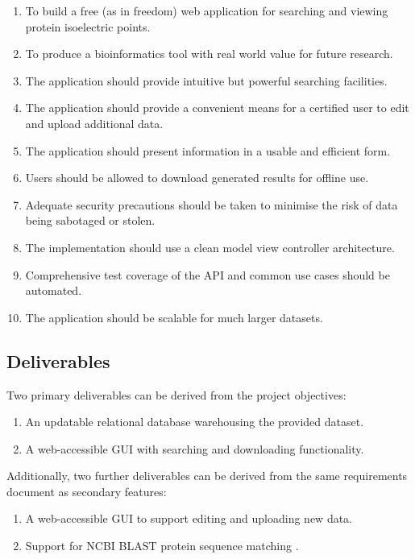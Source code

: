 \begin{enumerate}
\item To build a free (as in freedom) web application for searching and viewing
  protein isoelectric points.
\item To produce a bioinformatics tool with real world value for future
  research.
\item The application should provide intuitive but powerful searching
  facilities.
\item The application should provide a convenient means for a certified user to
  edit and upload additional data.
\item The application should present information in a usable and efficient form.
\item Users should be allowed to download generated results for offline use.
\item Adequate security precautions should be taken to minimise the risk of data
  being sabotaged or stolen.
\item The implementation should use a clean model view controller architecture.
\item Comprehensive test coverage of the API and common use cases should be
  automated.
\item The application should be scalable for much larger datasets.
\end{enumerate}

\subsection{Deliverables}
Two primary deliverables can be derived from the project objectives:

\begin{enumerate}
\item An updatable relational database warehousing the provided dataset.
\item A web-accessible GUI with searching and downloading functionality.
\end{enumerate}

\noindent
Additionally, two further deliverables can be derived from the same requirements
document as secondary features:

\begin{enumerate}
\item A web-accessible GUI to support editing and uploading new data.
\item Support for NCBI BLAST protein sequence matching \cite{NCBIND}.
\end{enumerate}

